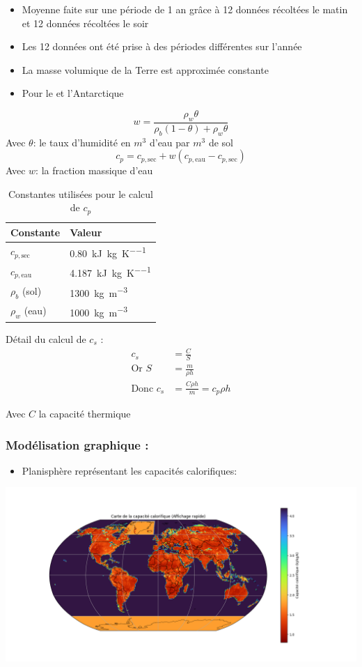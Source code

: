 \documentclass[a4paper,12pt]{article}
\begin{document}
\begin{itemize}
    \item Moyenne faite sur une période de 1 an grâce à 12 données récoltées le matin et 12 données récoltées le soir 
    \item Les 12 données ont été prise à des périodes différentes sur l'année 
    \item La masse volumique de la Terre est approximée constante 
    \item Pour le  et l’Antarctique  
\end{itemize}
\[
w = \frac{\rho_w \theta}{\rho_b (1 - \theta) + \rho_w \theta}
\]
Avec \(\theta\): le taux d'humidité en \(m^3\) d'eau par \(m^3\) de sol 
\[
c_p = c_{p,\text{sec}} + w (c_{p,\text{eau}} - c_{p,\text{sec}})
\]
Avec \(w\): la fraction massique d'eau 
\begin{table}[h!]
\centering
\begin{tabular}{ll}
\textbf{Constante} & \textbf{Valeur} \\
\hline
$c_{p,\text{sec}}$ & \SI{0.80}{\kilo\joule\per\kilogram\per\kelvin} \\
$c_{p,\text{eau}}$ & \SI{4.187}{\kilo\joule\per\kilogram\per\kelvin} \\
$\rho_b$ (sol) & \SI{1300}{\kilogram\per\cubic\metre} \\
$\rho_w$ (eau) & \SI{1000}{\kilogram\per\cubic\metre} \\
\end{tabular}
\caption*{Constantes utilisées pour le calcul de $c_p$}
\vspace{1cm}
\end{table}

Détail du calcul de \( c_s \) :\\
\begin{align*}
c_s &= \frac{C}{S} \\
\text{Or } S &= \frac{m}{\rho h} \\
\text{Donc } c_s &= \frac{C \rho h}{m} = c_p  \rho  h
\end{align*}

\hspace*{2cm}Avec \( C \) la capacité thermique



\subsubsection*{Modélisation graphique  :} 
\begin{itemize}
    \item Planisphère représentant les capacités calorifiques: 
\end{itemize}
\includegraphics[width=0.8\linewidth]{modele4/figures/c_humidite.png}
\end{document}
